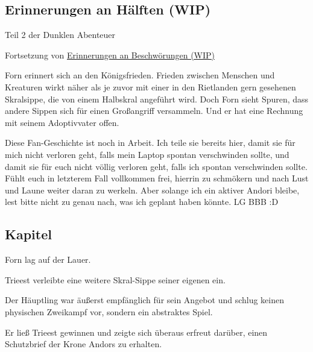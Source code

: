 \begin{chapterbox}
    \chapter{Erinnerungen an Hälften (WIP)}
    \label{wip-erinnerungen-an-haelften}
    
    \begin{center}
        Teil 2 der Dunklen Abenteuer

        Fortsetzung von \hyperref[wip-erinnerungen-an-beschwoerungen]{Erinnerungen an Beschwörungen (WIP)}
    \end{center}

    Forn erinnert sich an den Königsfrieden. Frieden zwischen Menschen und Kreaturen wirkt näher als je zuvor mit einer in den Rietlanden gern gesehenen Skralsippe, die von einem Halbskral angeführt wird. Doch Forn sieht Spuren, dass andere Sippen sich für einen Großangriff versammeln. Und er hat eine Rechnung mit seinem Adoptivvater offen.
\end{chapterbox}



Diese Fan-Geschichte ist noch in Arbeit. Ich teile sie bereits hier, damit sie für mich nicht verloren geht, falls mein Laptop spontan verschwinden sollte, und damit sie für euch nicht völlig verloren geht, falls ich spontan verschwinden sollte. Fühlt euch in letzterem Fall vollkommen frei, hierrin zu schmökern und nach Lust und Laune weiter daran zu werkeln. Aber solange ich ein aktiver Andori bleibe, lest bitte nicht zu genau nach, was ich geplant haben könnte. LG BBB :D










\newpage
\section{Kapitel}


Forn lag auf der Lauer.




\trennzeichen


Trieest verleibte eine weitere Skral-Sippe seiner eigenen ein. 

Der Häuptling war äußerst empfänglich für sein Angebot und schlug keinen physischen Zweikampf vor, sondern ein abstraktes Spiel. 

Er ließ Trieest gewinnen und zeigte sich überaus erfreut darüber, einen Schutzbrief der Krone Andors zu erhalten.





